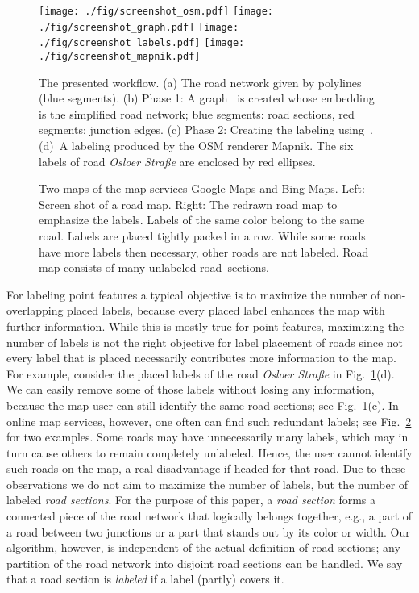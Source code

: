 \documentclass[a4paper,11pt]{article}
\begin{document}
\begin{figure}[t]
\centering
\texttt{[image: ./fig/screenshot\_osm.pdf]}
\texttt{[image: ./fig/screenshot\_graph.pdf]}
\texttt{[image: ./fig/screenshot\_labels.pdf]}
\texttt{[image: ./fig/screenshot\_mapnik.pdf]}
\caption{The presented workflow. (a) The road network given by
  polylines (blue segments). (b) Phase 1:
  A graph~ is created whose embedding is the simplified road
  network; blue segments: road sections, red segments: junction
  edges. (c) Phase 2: Creating the
  labeling using~. (d)~A labeling produced
  by the OSM renderer Mapnik. The six labels of road \emph{Osloer Straße} are enclosed by red ellipses. }
\label{fig:motivation}
\end{figure}


\begin{figure}[t]
\centering
{}
\caption{Two maps of the map services Google Maps and Bing Maps. Left: Screen shot of a road map. Right: The redrawn road map to emphasize the labels. Labels of the same color belong to the same road.  Labels are placed tightly packed in a row. While some roads have more labels then necessary, other roads are not labeled.  Road map consists of many unlabeled road~sections.}
\label{fig:webservices}
\end{figure}


For labeling point features a typical objective is to maximize the
number of non-overlapping placed labels, because every placed label
enhances the map with further information. While this is mostly
true for point features, maximizing the number of labels is not the
right objective for label placement of roads since not every label
that is placed necessarily contributes more information to the
map. For example, consider the placed labels of the road \emph{Osloer Straße}
in Fig.~\ref{fig:motivation}(d).  We can
easily remove some of those labels without losing any information,
because the map user can still identify the same road sections; see
Fig.~\ref{fig:motivation}(c). In online map services,
however, one often can find such redundant labels; see
Fig.~\ref{fig:webservices} for two examples.  Some
roads may have unnecessarily many labels, which may in turn cause others to remain completely
unlabeled. Hence, the user
cannot identify such roads on the map, a real disadvantage if headed
for that road.  Due to these observations we do not aim to maximize
the number of labels, but the number of labeled \emph{road
  sections}. For the purpose of this paper, a \emph{road section}
forms a connected piece of the road network that logically belongs together,
e.g., a part of a road between two junctions or a part that stands out
by its color or width. Our algorithm, however, is independent of the actual definition of road sections; any partition of the road network into disjoint road sections can be handled. We say that a road section is \emph{labeled}
if a label (partly) covers it.
\end{document}
